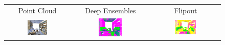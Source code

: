     \begin{figure}[h!]
        \centering
        \begin{tabular}{ccc}
            Point Cloud & Deep Ensembles & Flipout \\
            \includegraphics[width=0.33\textwidth, height=0.16\textheight]{images/seg_output/s3dis_DE/S3DIS_1_RGB.pdf} &
            \includegraphics[width=0.33\textwidth, height=0.16\textheight]{images/seg_output/s3dis_DE/S3DIS_1_Pred.pdf} &
            \includegraphics[width=0.33\textwidth, height=0.16\textheight]{images/seg_output/s3dis_DE/office_3.pdf} \\


\end{tabular}
\end{figure}
